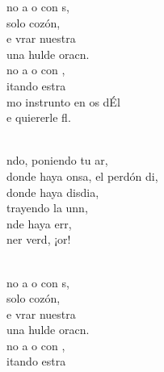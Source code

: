\documentclass[12pt]{article}
\begin{document}
\begin{multicols*}{2}
\begin{cancion}%
	\begin{chorus}%
	no a o con s,\\
	 solo cozón,\\
	e vrar nuestra   \\
	 una hulde oracn.\\
	no a o con , \\
	itando estra \\
	mo instrunto en os dÉl\\
	e quiererle fl.\\
	\end{chorus}%
	\jump\\
	ndo, poniendo tu ar,\\
	donde haya onsa, el perdón di,\\
	donde haya disdia, \\
	trayendo la unn,\\
	nde haya err, \\
	ner verd, ¡or! \\\jump\\
	\begin{chorus}%
	no a o con s,\\
	 solo cozón,\\
	e vrar nuestra   \\
	 una hulde oracn.\\
	no a o con , \\
	itando estra \\

\end{chorus}
\end{cancion}
\end{multicols*}
\end{document}

